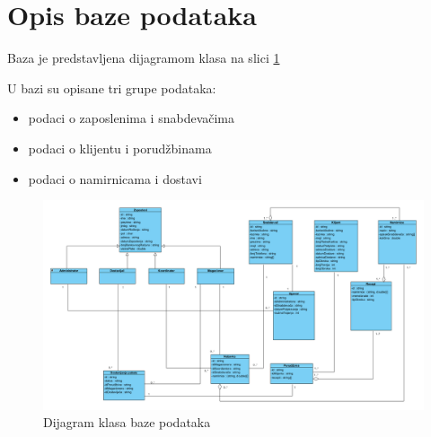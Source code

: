 \section{\bfseries Opis baze podataka}
Baza je predstavljena dijagramom klasa na slici \ref{fig:ClassDiagramDatabase}

U bazi su opisane tri grupe podataka:
\begin{itemize}
    \item podaci o zaposlenima i snabdevačima
    \item podaci o klijentu i porudžbinama
    \item podaci o namirnicama i dostavi
\end{itemize}





\begin{figure}[H]
	\begin{center}
		\includegraphics[width=\textwidth]{Pictures/class_diagram_database.png}
    		\caption{Dijagram klasa baze podataka}
    \label{fig:ClassDiagramDatabase}
    \end{center}
\end{figure}
